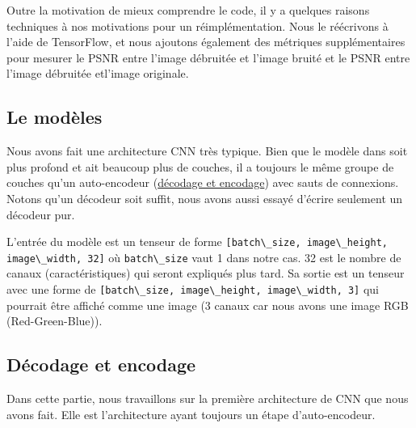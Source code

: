 \documentclass[
  11pt,
  dvipsnames]{article}
\newcommand{\passthrough}[1]{#1}
\begin{document}
Outre la motivation de mieux comprendre le code, il y a
quelques raisons techniques à nos motivations pour un réimplémentation.
Nous le réécrivons à l'aide de TensorFlow, et nous ajoutons également
des métriques supplémentaires pour mesurer le PSNR entre l'image
débruitée et l'image bruité et le PSNR entre l'image débruitée etl'image originale.

\hypertarget{le-moduxe8les}{%
\subsection{Le modèles}\label{le-moduxe8les}}

Nous avons fait une architecture CNN très typique. Bien que le modèle dans \autocite{1711.10925}
soit plus profond et ait beaucoup plus de couches, il a toujours le même groupe de couches
qu'un auto-encodeur (\protect\hyperlink{duxe9codage-et-encodage}{décodage et encodage}) avec sauts de connexions. Notons qu'un décodeur soit suffit,
nous avons aussi essayé d'écrire seulement un décodeur pur.

L'entrée du modèle est un tenseur de forme \passthrough{\lstinline![batch\_size, image\_height, image\_width, 32]!} où \passthrough{\lstinline!batch\_size!} vaut 1 dans notre cas. 32 est le nombre de canaux (caractéristiques) qui seront expliqués plus tard. Sa sortie est un tenseur avec une forme de \passthrough{\lstinline![batch\_size, image\_height, image\_width, 3]!} qui pourrait être affiché comme une image (3 canaux car nous avons une image RGB (Red-Green-Blue)).

\hypertarget{duxe9codage-et-encodage}{%
\subsection{Décodage et encodage}\label{duxe9codage-et-encodage}}

Dans cette partie, nous travaillons sur la première architecture de CNN que nous avons fait.
Elle est l'architecture ayant toujours un étape d'auto-encodeur.
\end{document}
